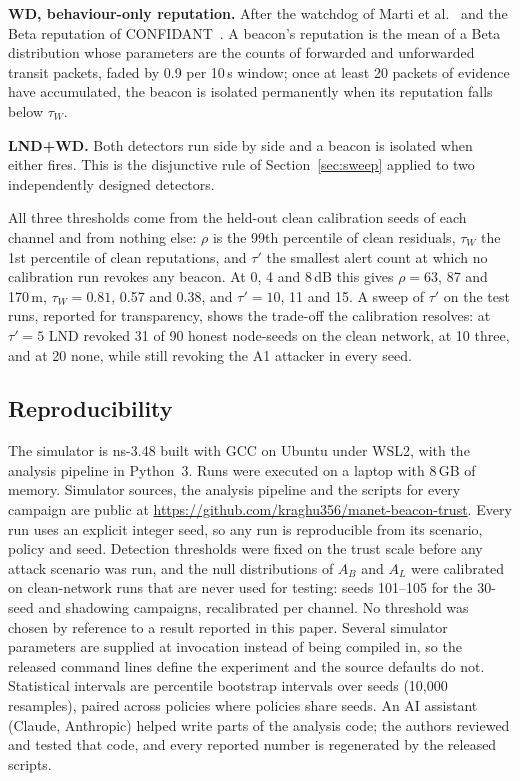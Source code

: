 \documentclass[pdflatex,sn-mathphys-num]{sn-jnl}%
\theoremstyle{thmstyleone}%
\theoremstyle{thmstyletwo}%
\theoremstyle{thmstylethree}%
\begin{document}
\textbf{WD, behaviour-only reputation.} After the watchdog of Marti
et al.~\cite{marti2000mitigating} and the Beta reputation of
CONFIDANT~\cite{buchegger2002confidant}. A beacon's reputation is the mean of
a Beta distribution whose parameters are the counts of forwarded and
unforwarded transit packets, faded by 0.9 per 10\,s window; once at least 20
packets of evidence have accumulated, the beacon is isolated permanently when
its reputation falls below $\tau_W$.

\textbf{LND+WD.} Both detectors run side by side and a beacon is isolated
when either fires. This is the disjunctive rule of Section~\ref{sec:sweep}
applied to two independently designed detectors.

All three thresholds come from the held-out clean calibration seeds of each
channel and from nothing else: $\rho$ is the 99th percentile of clean
residuals, $\tau_W$ the 1st percentile of clean reputations, and $\tau'$ the
smallest alert count at which no calibration run revokes any beacon. At
0, 4 and 8\,dB this gives $\rho = 63$, 87 and 170\,m, $\tau_W = 0.81$, 0.57
and 0.38, and $\tau' = 10$, 11 and 15. A sweep of $\tau'$ on the test runs,
reported for transparency, shows the trade-off the calibration resolves: at
$\tau' = 5$ LND revoked 31 of 90 honest node-seeds on the clean network, at
10 three, and at 20 none, while still revoking the A1 attacker in every seed.

\subsection{Reproducibility}

The simulator is ns-3.48 built with GCC on Ubuntu under WSL2, with the analysis
pipeline in Python~3. Runs were executed on a laptop with 8\,GB of memory. Simulator sources, the analysis pipeline and the scripts
for every campaign are public at
\url{https://github.com/kraghu356/manet-beacon-trust}. Every run uses an explicit integer seed, so any run is
reproducible from its scenario, policy and seed. Detection thresholds were
fixed on the trust scale before any attack scenario was run, and the null
distributions of $A_B$ and $A_L$ were calibrated on clean-network runs that
are never used for testing: seeds 101--105 for the 30-seed and shadowing
campaigns, recalibrated per channel. No threshold was chosen by reference to a
result reported in this paper. Several simulator parameters are supplied at
invocation instead of being compiled in, so the released command lines
define the experiment and the source defaults do not. Statistical intervals are percentile
bootstrap intervals over seeds (10{,}000 resamples), paired across policies
where policies share seeds. An AI assistant (Claude, Anthropic) helped write
parts of the analysis code; the authors reviewed and tested that code, and
every reported number is regenerated by the released scripts.
\end{document}

